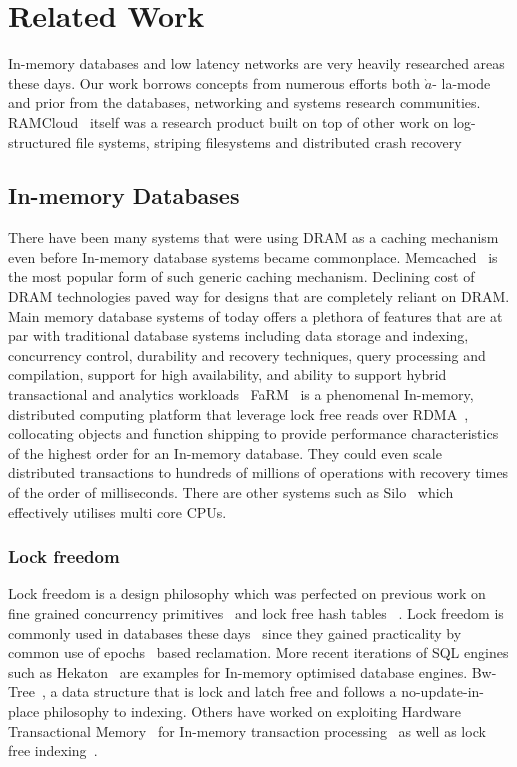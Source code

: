 
\chapter{Related Work}
In-memory databases and low latency networks are very heavily researched areas
these days. Our work borrows concepts from numerous efforts both $\grave{a}$-
la-mode and prior from the databases, networking and systems research communities.
RAMCloud~\cite{ramcloud} itself was a research product built on top of other 
work on log-structured file systems, striping filesystems and distributed 
crash recovery~\cite{ryan-thesis}

\section{In-memory Databases}
There have been many systems that were using DRAM as a caching mechanism even before
In-memory database systems became commonplace. Memcached~\cite{memcached-orig} is 
the most popular form of such generic caching mechanism. Declining cost of DRAM 
technologies paved way for designs that are completely reliant on DRAM. Main memory
database systems of today offers a plethora of features that are at par with traditional
database systems including data storage and indexing, concurrency control, durability and 
recovery techniques, query processing and compilation, support for high availability, and 
ability to support hybrid transactional and analytics workloads~\cite{mmdbmstutorial}
FaRM~\cite{farm} is a phenomenal In-memory, distributed computing platform that leverage lock free reads over RDMA~\cite{rdma},
collocating objects and function shipping to provide performance characteristics of the 
highest order for an In-memory database. They could even scale distributed transactions to
hundreds of millions of operations with recovery times of the order of milliseconds. There 
are other systems such as Silo~\cite{silo} which effectively utilises multi core CPUs.

\subsection{Lock freedom}
Lock freedom is a design philosophy which was perfected on previous work on fine grained concurrency 
primitives~\cite{finegrained} and lock free hash tables ~\cite{lockfreeht}. Lock freedom is commonly
used in databases these days~\cite{htm} since they gained practicality by common use of
epochs~\cite{lockfreedom} based reclamation. 
More recent iterations of SQL engines such as Hekaton~\cite{hekaton} are 
examples for In-memory optimised  database engines. Bw-Tree~\cite{bw-tree}, a 
data structure that is lock and latch free and follows a no-update-in-place philosophy to indexing.
Others have worked on exploiting Hardware Transactional Memory~\cite{htm-old}
for In-memory transaction processing~\cite{drtm} as well as lock free indexing~\cite{htm}.

